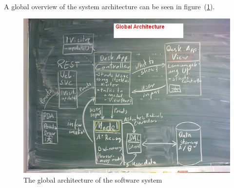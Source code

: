 A global overview of the system architecture can be seen in 
figure~(\ref{fig:globalarchitecture}).
\begin{figure}[htbp]
\begin{center}
\includegraphics[scale=0.5]{images/TechnicalDesign/GlobalArchitecture.png}
\caption{The global architecture of the software system}
\label{fig:globalarchitecture}
\end{center}
\end{figure}

